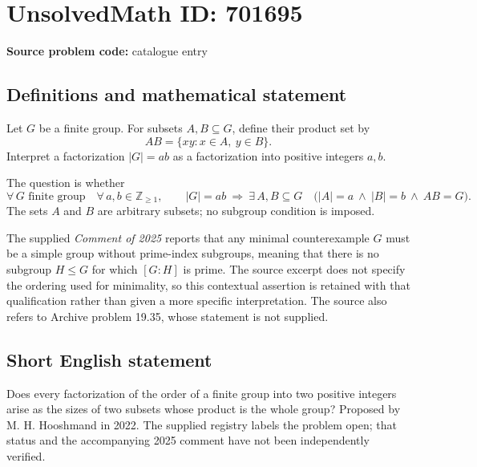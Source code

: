 \documentclass[11pt]{article}
\newcommand{\Z}{\mathbb{Z}}
\begin{document}
\section*{UnsolvedMath ID: 701695}
\textbf{Source problem code:} catalogue entry
\subsection{Definitions and mathematical statement}
Let \(G\) be a finite group. For subsets \(A,B\subseteq G\), define their product set by
\[
AB=\{xy:x\in A,\ y\in B\}.
\]
Interpret a factorization \(|G|=ab\) as a factorization into positive integers \(a,b\).

The question is whether
\[
\forall\,G\text{ finite group}\quad
\forall\,a,b\in\Z_{\geq 1},\qquad
|G|=ab\ \Longrightarrow\
\exists\,A,B\subseteq G\quad
\bigl(|A|=a\ \land\ |B|=b\ \land\ AB=G\bigr).
\]
The sets \(A\) and \(B\) are arbitrary subsets; no subgroup condition is imposed.

The supplied \emph{Comment of 2025} reports that any minimal counterexample \(G\) must be a simple group without prime-index subgroups, meaning that there is no subgroup \(H\leq G\) for which \([G:H]\) is prime. The source excerpt does not specify the ordering used for minimality, so this contextual assertion is retained with that qualification rather than given a more specific interpretation. The source also refers to Archive problem 19.35, whose statement is not supplied.
\subsection{Short English statement}
Does every factorization of the order of a finite group into two positive integers arise as the sizes of two subsets whose product is the whole group? Proposed by M. H. Hooshmand in 2022. The supplied registry labels the problem open; that status and the accompanying 2025 comment have not been independently verified.
\end{document}
